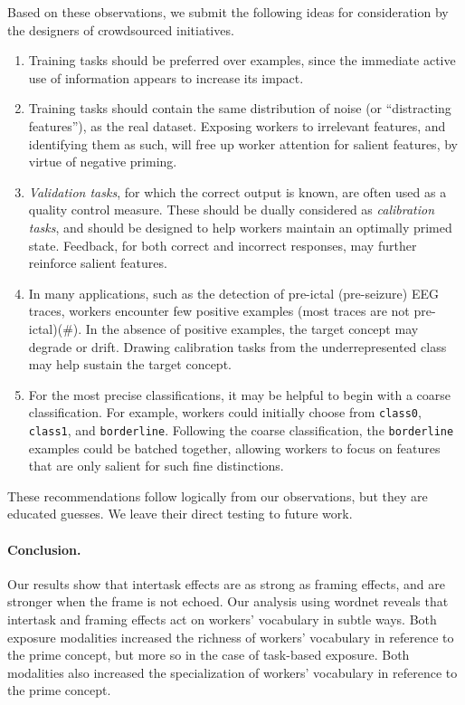 \documentclass[12pt]{article}
\begin{document}
Based on these observations, we submit the following ideas for consideration 
by the designers of crowdsourced initiatives.
\begin{enumerate}
	\item{
		Training tasks should be preferred over examples, since the immediate
		active use of information appears to increase its impact.
	}
	\item{
		Training tasks should contain the same distribution of 
		noise (or ``distracting features''), as the real dataset.
		Exposing workers to irrelevant features, and identifying them as such,
		will free up worker attention for salient features, by virtue of
		negative priming.
	}
	\item{
		\textit{Validation tasks}, for which the correct output is known,
		are often used as a quality control measure.
		These should be dually considered as \textit{calibration tasks}, and
		should be designed to help workers maintain an optimally primed 
		state. Feedback, for both correct and incorrect responses, 
		may further reinforce salient features.
	}
	\item{
		In many applications, such as the detection of pre-ictal 
		(pre-seizure) EEG traces, workers encounter few positive examples
		(most traces are not pre-ictal)(\#).  In the absence of positive 
		examples, the target concept may degrade or drift.
		Drawing calibration tasks from the underrepresented class may 
		help sustain the target concept.
	}
	\item{
		For the most precise classifications, it may be helpful to
		begin with a coarse classification.  For example, workers could 
		initially choose from  \texttt{class0}, \texttt{class1}, and 
		\texttt{borderline}.  Following the coarse classification, the 
		\texttt{borderline} examples could be batched together, allowing 
		workers to focus on features that are only salient for such fine 
		distinctions.
	}
\end{enumerate}

These recommendations follow logically from our observations, but they are 
educated guesses.  We leave their direct testing to future work.

\paragraph{Conclusion.}
Our results show that intertask effects are 
as strong as framing effects, and are stronger when the frame is not echoed.
Our analysis using wordnet reveals that intertask and framing effects
act on workers' vocabulary in subtle ways.  Both exposure modalities 
increased the richness of workers' vocabulary in reference to the prime 
concept, but more so in the case of task-based exposure.  Both modalities 
also increased the specialization of workers' vocabulary in reference to the 
prime concept.
\end{document}
